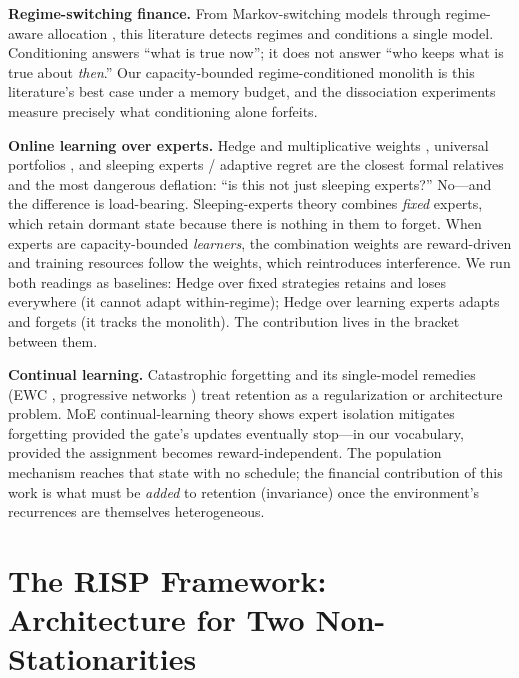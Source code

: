 \documentclass[10pt]{article}
\newcommand{\nm}{\textsc{RISP}}
\begin{document}
\textbf{Regime-switching finance.} From Markov-switching models
\cite{hamilton1989new} through regime-aware allocation
\cite{ang2012regime, guidolin2007asset, nystrup2018dynamic,
nystrup2020greedy}, this literature detects regimes and conditions a
single model. Conditioning answers ``what is true now''; it does not
answer ``who keeps what is true about \emph{then}.'' Our capacity-bounded
regime-conditioned monolith is this literature's best case under a memory
budget, and the dissociation experiments measure precisely what
conditioning alone forfeits.

\textbf{Online learning over experts.} Hedge and multiplicative weights
\cite{freund1997decision, arora2012multiplicative}, universal portfolios
\cite{cover1991universal, li2014online}, and sleeping experts / adaptive
regret \cite{freund1997sleeping, hazan2009adaptive, daniely2015strongly}
are the closest formal relatives and the most dangerous deflation: ``is
this not just sleeping experts?'' No---and the difference is load-bearing.
Sleeping-experts theory combines \emph{fixed} experts, which retain
dormant state because there is nothing in them to forget. When experts are
capacity-bounded \emph{learners}, the combination weights are
reward-driven and training resources follow the weights, which
reintroduces interference. We run both readings as baselines: Hedge over
fixed strategies retains and loses everywhere (it cannot adapt
within-regime); Hedge over learning experts adapts and forgets (it tracks
the monolith). The contribution lives in the bracket between them.

\textbf{Continual learning.} Catastrophic forgetting
\cite{french1999catastrophic, parisi2019continual} and its single-model
remedies (EWC \cite{kirkpatrick2017overcoming}, progressive networks
\cite{rusu2016progressive}) treat retention as a regularization or
architecture problem. MoE continual-learning theory \cite{li2024moecl}
shows expert isolation mitigates forgetting provided the gate's updates
eventually stop---in our vocabulary, provided the assignment becomes
reward-independent. The population mechanism reaches that state with no
schedule; the financial contribution of this work is what must be
\emph{added} to retention (invariance) once the environment's recurrences
are themselves heterogeneous.

\section{The \nm{} Framework: Architecture for Two Non-Stationarities}
\label{sec:framework}
\end{document}

